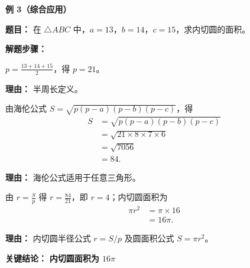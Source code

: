 \begin{examplebox}
	\medskip
	\textbf{\textcolor{CExample}{例 3（综合应用）}}

	\textbf{\textcolor{CExample}{题目：}}
	在 $\triangle ABC$ 中，$a=13$，$b=14$，$c=15$，求内切圆的面积。

	\textbf{\textcolor{CExample}{解题步骤：}}
	\begin{description}[style=nextline, leftmargin=2.8em, labelsep=0.5em, itemsep=0.45em]
		\item[\textbf{第一步（求半周长）：}] $p = \frac{13+14+15}{2}$，得 $p=21$。
			\par\textbf{理由：} 半周长定义。
		\item[\textbf{第二步（求三角形面积）：}] 由海伦公式 $S=\sqrt{p(p-a)(p-b)(p-c)}$，得
			\[
				\begin{aligned}
					S &= \sqrt{p(p-a)(p-b)(p-c)} \\
					&= \sqrt{21 \times 8 \times 7 \times 6} \\
					&= \sqrt{7056} \\
					&= 84.
			\end{aligned}
			\]
			\par\textbf{理由：} 海伦公式适用于任意三角形。
		\item[\textbf{第三步（求内切圆半径与面积）：}] 由 $r = \frac{S}{p}$ 得 $r = \frac{84}{21}$，即 $r=4$；内切圆面积为
			\[
				\begin{aligned}
					\pi r^2 &= \pi \times 16 \\
					&= 16\pi.
			\end{aligned}
			\]
			\par\textbf{理由：} 内切圆半径公式 $r=S/p$ 及圆面积公式 $S=\pi r^2$。
	\end{description}

	\textbf{\textcolor{CExample}{关键结论：}}
	\textbf{内切圆面积为 $16\pi$}
\end{examplebox}
